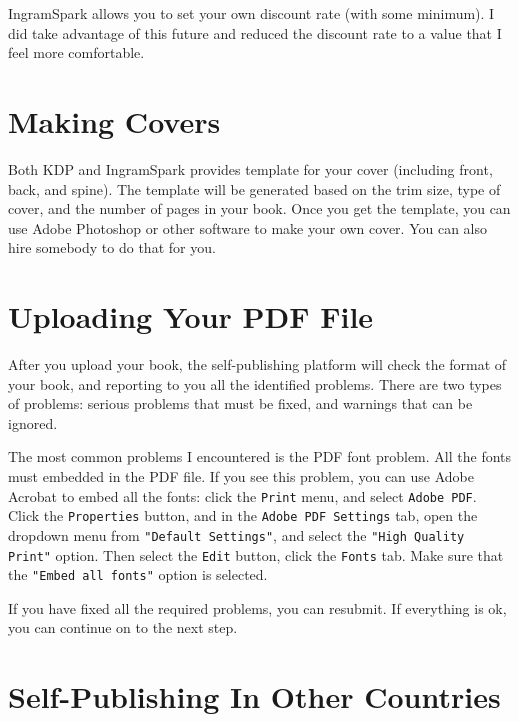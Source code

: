 IngramSpark allows you to set your own discount rate (with some minimum). I did take advantage
of this future and reduced the discount rate to a value that I feel more comfortable. 




\section{Making Covers} 

Both KDP and IngramSpark provides template for your cover (including front, back, and spine). 
The template will be generated based on the trim size, type of cover, and the number of pages
in your book. Once you get the template, you can use Adobe Photoshop or other software to
make your own cover. You can also hire somebody to do that for you. 



\section{Uploading Your PDF File}


After you upload your book, the self-publishing platform will check the format of your book,
and reporting to you all the identified problems. There are two types of problems: serious
problems that must be fixed, and warnings that can be ignored. 


The most common problems I encountered is the PDF font problem. All the fonts must embedded in
the PDF file. If you see this problem, you can use Adobe Acrobat to embed all the fonts: click
the \texttt{Print} menu, and select \texttt{Adobe PDF}. Click the \texttt{Properties} button,
and in the \texttt{Adobe PDF Settings} tab, open the dropdown menu from
\texttt{"Default Settings"}, and select the \texttt{"High Quality Print"} option.
Then select the \texttt{Edit} button, click the \texttt{Fonts} tab. Make sure that 
the \texttt{"Embed all fonts"} option is selected.  


If you have fixed all the required problems, you can resubmit. If everything is ok, you can
continue on to the next step. 




\section{Self-Publishing In Other Countries}

